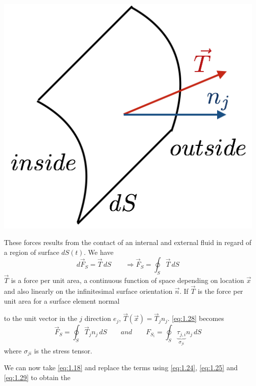 \begin{itemize}
		\begin{minipage}{0.23\textwidth}
		\includegraphics[scale=0.3]{ch1/5}
		\label{fig:1.5}
		\end{minipage}
		\begin{minipage}{0.7\textwidth}
		These forces results from the contact of an internal and external fluid in regard of a region of surface $dS(t)$. We have 
		\begin{equation}
			d\vec{F}_S = \vec{T}\, dS \qquad \Rightarrow \vec{F}_S = \oint _S \vec{T}\, dS
			\label{eq:1.28}
		\end{equation}
		$\vec{T}$ is a force per unit area, a continuous function of space depending on location $\vec{x}$ and also linearly on the infinitesimal surface orientation $\vec{n}$. If $\vec{T}$ is the force per unit area for a surface element normal
		\end{minipage}
		 to the unit vector in the $j$ direction $e_j$, $\vec{T}(\vec{x}) = \vec{T}_jn_j$. \autoref{eq:1.28} becomes
		 \begin{equation}
		 \vec{F}_S = \oint _S \vec{T}_j n_j \, dS \qquad and \qquad F_{S_i} = \oint _S \underbrace{\tau _{j,i}}_{\sigma _{ji}} n_j\, dS 
		 \label{eq:1.29}
		 \end{equation}
		 where $\sigma _{ji}$ is the stress tensor. 
		\end{itemize}
		We can now take \autoref{eq:1.18} and replace the terms using \autoref{eq:1.24}, \autoref{eq:1.25} and \autoref{eq:1.29} to obtain the 
		
